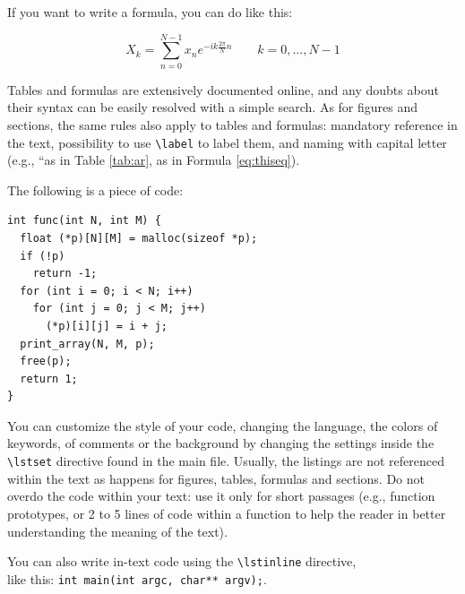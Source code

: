 If you want to write a formula, you can do like this:

\begin{equation}\label{eq:thiseq}
	X_{k}=\sum _{n=0}^{N-1}x_{n}e^{-ik{\frac {2\pi }{N}}n}\quad \quad k=0,\dots ,N-1
\end{equation}

Tables and formulas are extensively documented online, and any doubts about their syntax can be easily resolved with a simple search. As for figures and sections, the same rules also apply to tables and formulas: mandatory reference in the text, possibility to use \lstinline{\label} to label them, and naming with capital letter (e.g., ``as in Table \ref{tab:ar}, as in Formula \ref{eq:thiseq}).

The following is a piece of code:

\begin{lstlisting}
int func(int N, int M) {
  float (*p)[N][M] = malloc(sizeof *p);
  if (!p)
    return -1;
  for (int i = 0; i < N; i++)
    for (int j = 0; j < M; j++)
      (*p)[i][j] = i + j;
  print_array(N, M, p);
  free(p);
  return 1;
}
\end{lstlisting}

You can customize the style of your code, changing the language, the colors of keywords, of comments or the background by changing the settings inside the \lstinline{\lstset} directive found in the main file. Usually, the listings are not referenced within the text as happens for figures, tables, formulas and sections. Do not overdo the code within your text: use it only for short passages (e.g., function prototypes, or 2 to 5 lines of code within a function to help the reader in better understanding the meaning of the text).

You can also write in-text code using the \lstinline{\lstinline} directive, \\
like this: \lstinline{int main(int argc, char** argv);}.



